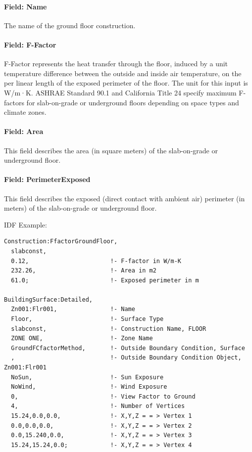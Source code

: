 \paragraph{Field: Name}\label{field-name-30-000}

The name of the ground floor construction.

\paragraph{Field: F-Factor}\label{field-f-factor}

F-Factor represents the heat transfer through the floor, induced by a unit temperature difference between the outside and inside air temperature, on the per linear length of the exposed perimeter of the floor. The unit for this input is W/m·K. ASHRAE Standard 90.1 and California Title 24 specify maximum F-factors for slab-on-grade or underground floors depending on space types and climate zones.

\paragraph{Field: Area}\label{field-area}

This field describes the area (in square meters) of the slab-on-grade or underground floor.

\paragraph{Field: PerimeterExposed}\label{field-perimeterexposed}

This field describes the exposed (direct contact with ambient air) perimeter (in meters) of the slab-on-grade or underground floor.

IDF Example:

\begin{lstlisting}
Construction:FfactorGroundFloor,
  slabconst,
  0.12,                       !- F-factor in W/m-K
  232.26,                     !- Area in m2
  61.0;                       !- Exposed perimeter in m

BuildingSurface:Detailed,
  Zn001:Flr001,               !- Name
  Floor,                      !- Surface Type
  slabconst,                  !- Construction Name, FLOOR
  ZONE ONE,                   !- Zone Name
  GroundFCfactorMethod,       !- Outside Boundary Condition, Surface
  ,                           !- Outside Boundary Condition Object, Zn001:Flr001
  NoSun,                      !- Sun Exposure
  NoWind,                     !- Wind Exposure
  0,                          !- View Factor to Ground
  4,                          !- Number of Vertices
  15.24,0.0,0.0,              !- X,Y,Z = = > Vertex 1
  0.0,0.0,0.0,                !- X,Y,Z = = > Vertex 2
  0.0,15.240,0.0,             !- X,Y,Z = = > Vertex 3
  15.24,15.24,0.0;            !- X,Y,Z = = > Vertex 4
\end{lstlisting}

